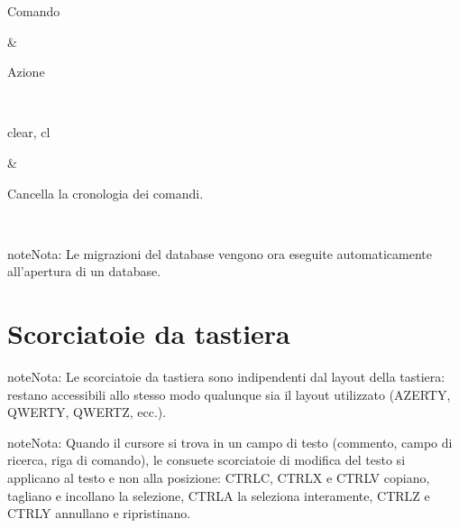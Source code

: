 \documentclass[letterpaper,10pt,italian]{sphinxmanual}
\begin{document}
\begin{savenotes}\sphinxattablestart
\sphinxthistablewithglobalstyle
\centering
\begin{tabular}[t]{}
\sphinxtoprule
\begin{varwidth}[t]{}
\sphinxstyletheadfamily \sphinxAtStartPar
Comando
\sphinxbeforeendvarwidth
\end{varwidth}%
&\begin{varwidth}[t]{}
\sphinxstyletheadfamily \sphinxAtStartPar
Azione
\sphinxbeforeendvarwidth
\end{varwidth}%
\\
\sphinxmidrule
\sphinxtableatstartofbodyhook\begin{varwidth}[t]{}
\sphinxAtStartPar
clear, cl
\sphinxbeforeendvarwidth
\end{varwidth}%
&\begin{varwidth}[t]{}
\sphinxAtStartPar
Cancella la cronologia dei comandi.
\sphinxbeforeendvarwidth
\end{varwidth}%
\\
\sphinxbottomrule
\end{tabular}
\sphinxtableafterendhook\par
\sphinxattableend\end{savenotes}

\begin{sphinxadmonition}{note}{Nota:}
\sphinxAtStartPar
Le migrazioni del database vengono ora eseguite automaticamente all’apertura di un database.
\end{sphinxadmonition}

\sphinxstepscope


\section{Scorciatoie da tastiera}
\label{\detokenize{raccourcis:raccourcis-clavier}}\label{\detokenize{raccourcis:raccourcis}}\label{\detokenize{raccourcis::doc}}
\begin{sphinxadmonition}{note}{Nota:}
\sphinxAtStartPar
Le scorciatoie da tastiera sono indipendenti dal layout della tastiera: restano accessibili allo stesso modo qualunque sia il layout utilizzato (AZERTY, QWERTY, QWERTZ, ecc.).
\end{sphinxadmonition}

\begin{sphinxadmonition}{note}{Nota:}
\sphinxAtStartPar
Quando il cursore si trova in un campo di testo (commento, campo di ricerca, riga di comando), le consuete scorciatoie di modifica del testo si applicano al testo e non alla posizione: CTRL\sphinxhyphen{}C, CTRL\sphinxhyphen{}X e CTRL\sphinxhyphen{}V copiano, tagliano e incollano la selezione, CTRL\sphinxhyphen{}A la seleziona interamente, CTRL\sphinxhyphen{}Z e CTRL\sphinxhyphen{}Y annullano e ripristinano.
\end{sphinxadmonition}
\end{document}

